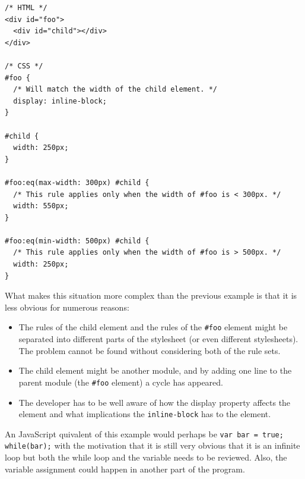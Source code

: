 \documentclass[a4paper,11pt]{kth-mag}
\newcommand{\code}[1]{\texttt{#1}}
\begin{document}
          \begin{lstlisting}[caption={Example of indirect cyclic rules.}, captionpos=b, label={code:cyclic-2}]
/* HTML */
<div id="foo">
  <div id="child"></div>
</div>

/* CSS */
#foo {
  /* Will match the width of the child element. */
  display: inline-block;
}

#child {
  width: 250px;
}

#foo:eq(max-width: 300px) #child {
  /* This rule applies only when the width of #foo is < 300px. */
  width: 550px;
}

#foo:eq(min-width: 500px) #child {
  /* This rule applies only when the width of #foo is > 500px. */
  width: 250px;
}
          \end{lstlisting}
          What makes this situation more complex than the previous example is that it is less obvious for numerous reasons:
          \begin{itemize}
            \item The rules of the child \gls{element} and the rules of the \code{\#foo} \gls{element} might be separated into different parts of the stylesheet (or even different stylesheets).
            The problem cannot be found without considering both of the rule sets.
            \item The child \gls{element} might be another module, and by adding one line to the parent module (the \code{\#foo} \gls{element}) a cycle has appeared.
            \item The developer has to be well aware of how the display property affects the \gls{element} and what implications the \code{inline-block} has to the \gls{element}.
          \end{itemize}
          An \gls{JavaScript} quivalent of this example would perhaps be \code{var bar = true; while(bar);} with the motivation that it is still very obvious that it is an infinite loop but both the while loop and the variable needs to be reviewed.
          Also, the variable assignment could happen in another part of the program.
\end{document}
